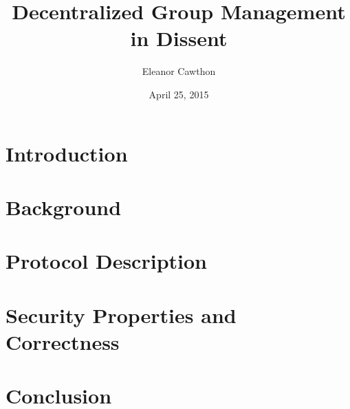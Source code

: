 \documentclass[finalcopy,nolof,nolot]{srpaper}
\title{Decentralized Group Management in Dissent}
\author{Eleanor Cawthon}
\date{April 25, 2015}
\begin{document}
\frontmatter

\chapter{Introduction}\label{Chapter:Intro}


\chapter{Background}\label{Chapter:Background}


% 
%
% 
%
\chapter{Protocol Description}\label{Chapter:Protocol}


\chapter{Security Properties and Correctness}\label{Chapter:Proofs}


\chapter{Conclusion}\label{Chapter:Conclusion}

\listoftodos


% 
%
\end{document}
